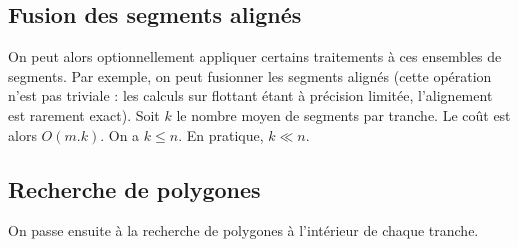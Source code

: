 \documentclass{article}
\begin{document}

\subsection{Fusion des segments alignés}

On peut alors optionnellement appliquer certains traitements à ces ensembles de segments. Par exemple, on peut fusionner les segments alignés (cette opération n'est pas triviale : les calculs sur flottant étant à précision limitée, l'alignement est rarement exact). Soit $k$ le nombre moyen de segments par tranche. Le coût est alors $O(m.k)$. On a $k \leq n$. En pratique, $k \ll n$.

\subsection{Recherche de polygones}

On passe ensuite à la recherche de polygones à l'intérieur de chaque tranche.
\end{document}
